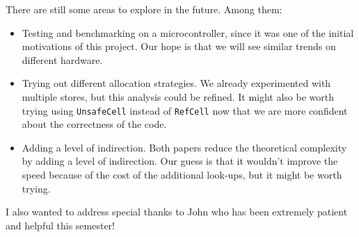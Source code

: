 \documentclass[12pt]{article}
\begin{document}
There are still some areas to explore in the future. Among them:
\begin{itemize}
  \item Testing and benchmarking on a microcontroller, since it was one of the initial motivations of this project. Our hope is that we will see similar trends on different hardware.
  \item Trying out different allocation strategies. We already experimented with multiple stores, but this analysis could be refined. It might also be worth trying using \texttt{UnsafeCell} instead of \texttt{RefCell} now that we are more confident about the correctness of the code.
  \item Adding a level of indirection. Both papers reduce the theoretical complexity by adding a level of indirection. Our guess is that it wouldn't improve the speed because of the cost of the additional look-ups, but it might be worth trying.
\end{itemize}

I also wanted to address special thanks to John who has been extremely patient and helpful this semester!

\newpage
\printbibliography
\end{document}
